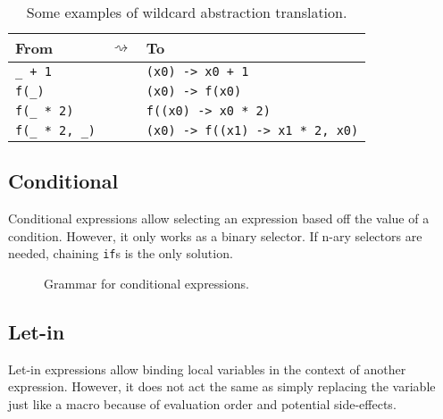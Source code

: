 \begin{table}[htb]
	\begin{tabularx}{\textwidth}{YcY}
		\toprule
		From                    &  & To                      \\
		\midrule
		\verb|_ + 1| &                                              & \verb|(x0) -> x0 + 1| \\
		\verb|f(_)| &                                              & \verb|(x0) -> f(x0)| \\
		\verb|f(_ * 2)| &                                              & \verb|f((x0) -> x0 * 2)| \\
		\verb|f(_ * 2, _)| &                                              & \verb|(x0) -> f((x1) -> x1 * 2, x0)| \\
		\bottomrule
	\end{tabularx}

	\caption{Some examples of wildcard abstraction translation.}
	\label{table:zilch-grammar-expressions-lambda-translatewildcard}
\end{table}

\subsection{Conditional}\label{subsec:zilch-grammar-expressions-conditional}

Conditional expressions allow selecting an expression based off the value of a condition.
However, it only works as a binary selector.
If n-ary selectors are needed, chaining \texttt{if}s is the only solution.

\begin{figure}[H]
	\centering


	\caption{Grammar for conditional expressions.}
	\label{fig:zilch-gramma-expressions-conditional-grammar}
\end{figure}

\subsection{Let-in}\label{subsec:zilch-grammar-expressions-letin}

Let-in expressions allow binding local variables in the context of another expression.
However, it does not act the same as simply replacing the variable just like a macro because of evaluation order and potential side-effects.

